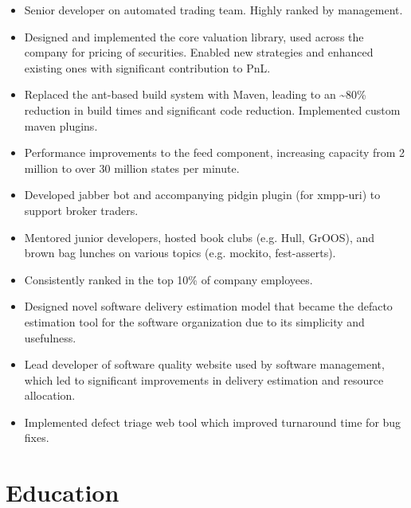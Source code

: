 \documentclass[11pt,a4paper,roman]{moderncv}
\begin{document}
\vspace{5mm}

\begin{itemize}
\item Senior developer on automated trading team. Highly ranked by management.
\item Designed and implemented the core valuation library, used across the company for pricing of securities. Enabled new strategies and enhanced existing ones with significant contribution to PnL.\newline
\item Replaced the ant-based build system with Maven, leading to an \textasciitilde80\% reduction in build times and significant code reduction. Implemented custom maven plugins.\newline
\item Performance improvements to the feed component, increasing capacity from 2 million to over 30 million states per minute.\newline
\item Developed jabber bot and accompanying pidgin plugin (for xmpp-uri) to support broker traders.\newline
\item Mentored junior developers, hosted book clubs (e.g. Hull, GrOOS), and brown bag lunches on various topics (e.g. mockito, fest-asserts).
\end{itemize}

\vspace{5mm}

\begin{itemize}
\item Consistently ranked in the top 10\% of company employees.
\item Designed novel software delivery estimation model that became the defacto estimation tool for the software organization due to its simplicity and usefulness.\newline
\item Lead developer of software quality website used by software management, which led to significant improvements in delivery estimation and resource allocation.\newline
\item Implemented defect triage web tool which improved turnaround time for bug fixes.\newline
\end{itemize}

\section{Education}
\end{document}
